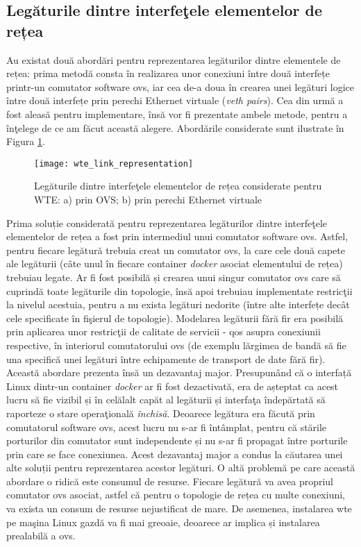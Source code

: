 \subsection{Legăturile dintre interfeţele elementelor de rețea}

Au existat două abordări pentru reprezentarea legăturilor dintre elementele de rețea: prima metodă consta în realizarea unor conexiuni între două interfețe printr-un comutator software \gls{ovs}, iar cea de-a doua în crearea unei legături logice între două interfețe prin perechi Ethernet virtuale (\textit{veth pairs}). Cea din urmă a fost aleasă pentru implementare, însă vor fi prezentate ambele metode, pentru a înţelege de ce am făcut această alegere. Abordările considerate sunt ilustrate în Figura \ref{fig:wte_link_representation}.

\begin{figure}[h]
	\centering
	\texttt{[image: wte\_link\_representation]}
	\caption{Legăturile dintre interfeţele elementelor de rețea considerate pentru WTE: a) prin OVS; b) prin perechi Ethernet virtuale}
	\label{fig:wte_link_representation}
\end{figure}

Prima soluție considerată pentru reprezentarea legăturilor dintre interfeţele elementelor de rețea a fost prin intermediul unui comutator software \gls{ovs}. Astfel, pentru fiecare legătură trebuia creat un comutator \gls{ovs}, la care cele două capete ale legăturii (câte unul în fiecare container \textit{docker} asociat elementului de rețea) trebuiau legate. Ar fi fost posibilă și crearea unui singur comutator \gls{ovs} care să cuprindă toate legăturile din topologie, însă apoi trebuiau implementate restricţii la nivelul acestuia, pentru a nu exista legături nedorite (între alte interfețe decât cele specificate în fişierul de topologie). Modelarea legăturii fără fir era posibilă prin aplicarea unor restricţii de calitate de servicii - \gls{qos} asupra conexiunii respective, în interiorul comutatorului \gls{ovs} (de exemplu lărgimea de bandă să fie una specifică unei legături între echipamente de transport de date fără fir). Această abordare prezenta însă un dezavantaj major. Presupunând că o interfață Linux dintr-un container \textit{docker} ar fi fost dezactivată, era de așteptat ca acest lucru să fie vizibil și în celălalt capăt al legăturii și interfaţa îndepărtată să raporteze o stare operaţională \textit{închisă}. Deoarece legătura era făcută prin comutatorul software \gls{ovs}, acest lucru nu s-ar fi întâmplat, pentru că stările porturilor din comutator sunt independente și nu s-ar fi propagat între porturile prin care se face conexiunea. Acest dezavantaj major a condus la căutarea unei alte soluții pentru reprezentarea acestor legături. O altă problemă pe care această abordare o ridică este consumul de resurse. Fiecare legătură va avea propriul comutator \gls{ovs} asociat, astfel că pentru o topologie de rețea cu multe conexiuni, va exista un consum de resurse nejustificat de mare. De asemenea, instalarea \gls{wte} pe maşina Linux gazdă va fi mai greoaie, deoarece ar implica și instalarea prealabilă a \gls{ovs}.

